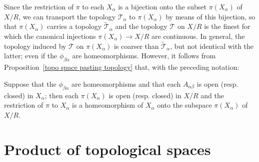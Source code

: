 Since the restriction of $\pi$ to each $X_\alpha$ is a bijection onto the subset $\pi(X_\alpha)$ of $X/R$, we can transport the topology $\mathcal{T}_\alpha$ to $\pi(X_\alpha)$ by means of this bijection, so that $\pi(X_\alpha)$ carries a topology $\widetilde{\mathcal{T}}_\alpha$ and the topology $\mathcal{T}$ on $X/R$ is the finest for which the canonical injections $\pi(X_\alpha)\to X/R$ are continuous. In general, the topology induced by $\mathcal{T}$ on $\pi(X_\alpha)$ is coarser than $\widetilde{\mathcal{T}}_\alpha$, but not identical with the latter; even if the $\phi_{\beta\alpha}$ are homeomorphisms. However, it follows from Proposition~\ref{topo space pasting topology} that, with the preceding notation:
\begin{proposition}
Suppose that the $\phi_{\beta\alpha}$ are homeomorphisms and that each $A_{\alpha\beta}$ is open (resp. closed) in $X_\alpha$; then each $\pi(X_\alpha)$ is open (resp. closed) in $X/R$ and the restriction of $\pi$ to $X_\alpha$ is a homeomorphism of $X_\alpha$ onto the subspace $\pi(X_\alpha)$ of $X/R$.
\end{proposition}
\section{Product of topological spaces}
